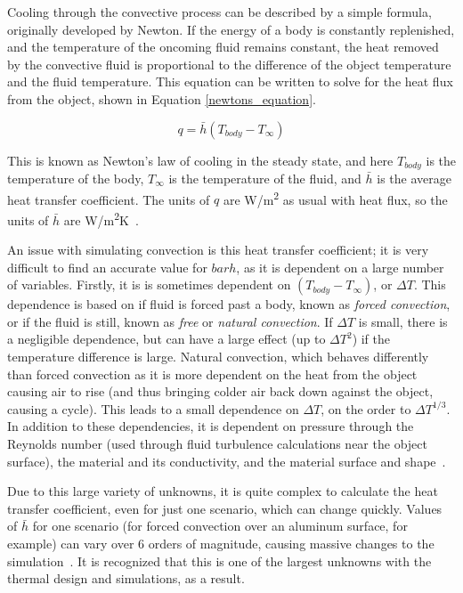 Cooling through the convective process can be described by a simple formula, originally developed by Newton. If the energy of a body is constantly replenished, and the temperature of the oncoming fluid remains constant, the heat removed by the convective fluid is proportional to the difference of the object temperature and the fluid temperature. This equation can be written to solve for the heat flux from the object, shown in Equation \ref{newtons_equation}.

\begin{equation}\label{newtons_equation}
    q = \bar{h}(T_{body} - T_{\infty})
\end{equation}

This is known as Newton's law of cooling in the steady state, and here $T_{body}$ is the temperature of the body, $T_{\infty}$ is the temperature of the fluid, and $\bar{h}$ is the average heat transfer coefficient. The units of $q$ are W/m\textsuperscript{2} as usual with heat flux, so the units of $\bar{h}$ are W/m\textsuperscript{2}K~\citep{heat_transfer_textbook}.

An issue with simulating convection is this heat transfer coefficient; it is very difficult to find an accurate value for $bar{h}$, as it is dependent on a large number of variables. Firstly, it is is sometimes dependent on $(T_{body} - T_{\infty})$, or $\Delta T$. This dependence is based on if fluid is forced past a body, known as \textit{forced convection}, or if the fluid is still, known as \textit{free} or \textit{natural convection}. If $\Delta T$ is small, there is a negligible dependence, but can have a large effect (up to $\Delta T^2$) if the temperature difference is large. Natural convection, which behaves differently than forced convection as it is more dependent on the heat from the object causing air to rise (and thus bringing colder air back down against the object, causing a cycle). This leads to a small dependence on $\Delta T$, on the order to $\Delta T^{1/3}$. In addition to these dependencies, it is dependent on pressure through the Reynolds number (used through fluid turbulence calculations near the object surface), the material and its conductivity, and the material surface and shape~\citep{heat_transfer_textbook}.

Due to this large variety of unknowns, it is quite complex to calculate the heat transfer coefficient, even for just one scenario, which can change quickly. Values of $\bar{h}$ for one scenario (for forced convection over an aluminum surface, for example) can vary over 6 orders of magnitude, causing massive changes to the simulation~\citep{heat_transfer_textbook}. It is recognized that this is one of the largest unknowns with the thermal design and simulations, as a result.

